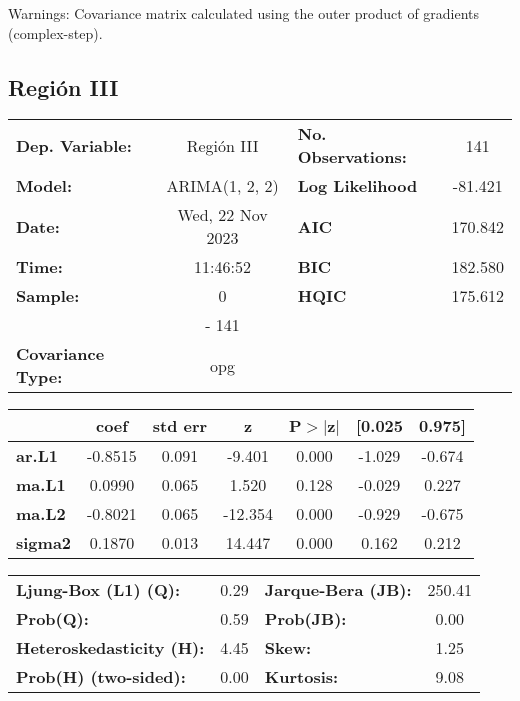 \documentclass{article}%
\begin{document}
Warnings: \newline
 [1] Covariance matrix calculated using the outer product of gradients (complex-step).%
\subsection*{Región III}%
\begin{center}
\begin{tabular}{lclc}
\toprule
\textbf{Dep. Variable:}          &    Región III    & \textbf{  No. Observations:  } &    141      \\
\textbf{Model:}                  &  ARIMA(1, 2, 2)  & \textbf{  Log Likelihood     } &  -81.421    \\
\textbf{Date:}                   & Wed, 22 Nov 2023 & \textbf{  AIC                } &  170.842    \\
\textbf{Time:}                   &     11:46:52     & \textbf{  BIC                } &  182.580    \\
\textbf{Sample:}                 &        0         & \textbf{  HQIC               } &  175.612    \\
\textbf{}                        &       - 141      & \textbf{                     } &             \\
\textbf{Covariance Type:}        &       opg        & \textbf{                     } &             \\
\bottomrule
\end{tabular}
\begin{tabular}{lcccccc}
                & \textbf{coef} & \textbf{std err} & \textbf{z} & \textbf{P$> |$z$|$} & \textbf{[0.025} & \textbf{0.975]}  \\
\midrule
\textbf{ar.L1}  &      -0.8515  &        0.091     &    -9.401  &         0.000        &       -1.029    &       -0.674     \\
\textbf{ma.L1}  &       0.0990  &        0.065     &     1.520  &         0.128        &       -0.029    &        0.227     \\
\textbf{ma.L2}  &      -0.8021  &        0.065     &   -12.354  &         0.000        &       -0.929    &       -0.675     \\
\textbf{sigma2} &       0.1870  &        0.013     &    14.447  &         0.000        &        0.162    &        0.212     \\
\bottomrule
\end{tabular}
\begin{tabular}{lclc}
\textbf{Ljung-Box (L1) (Q):}     & 0.29 & \textbf{  Jarque-Bera (JB):  } & 250.41  \\
\textbf{Prob(Q):}                & 0.59 & \textbf{  Prob(JB):          } &  0.00   \\
\textbf{Heteroskedasticity (H):} & 4.45 & \textbf{  Skew:              } &  1.25   \\
\textbf{Prob(H) (two-sided):}    & 0.00 & \textbf{  Kurtosis:          } &  9.08   \\
\bottomrule
\end{tabular}
\end{center}
\end{document}
